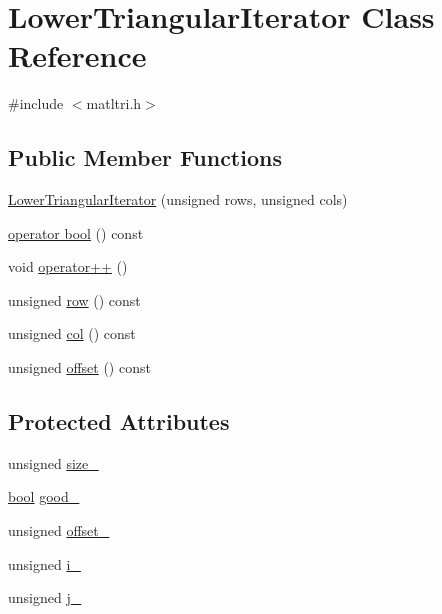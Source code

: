 \hypertarget{classLowerTriangularIterator}{}\section{Lower\+Triangular\+Iterator Class Reference}
\label{classLowerTriangularIterator}


{\ttfamily \#include $<$matltri.\+h$>$}

\subsection*{Public Member Functions}
\begin{DoxyCompactItemize}
\item 
\hyperlink{classLowerTriangularIterator_add29bef9ecb40a8b01968a773ffd753a}{Lower\+Triangular\+Iterator} (unsigned rows, unsigned cols)
\item 
\hyperlink{classLowerTriangularIterator_a1f8e805dbce1c75c1632db956964bb82}{operator bool} () const 
\item 
void \hyperlink{classLowerTriangularIterator_a3a6ef9b64d999f93ee128f74aca38527}{operator++} ()
\item 
unsigned \hyperlink{classLowerTriangularIterator_a7ab1227d3631b54fa8232a5e6be63f90}{row} () const 
\item 
unsigned \hyperlink{classLowerTriangularIterator_ae40bea60442dec3df59a9ac33f321362}{col} () const 
\item 
unsigned \hyperlink{classLowerTriangularIterator_ac7ce365e64b671be6c612d27da6b1f35}{offset} () const 
\end{DoxyCompactItemize}
\subsection*{Protected Attributes}
\begin{DoxyCompactItemize}
\item 
unsigned \hyperlink{classLowerTriangularIterator_a4e7c1d15a20473697c3d5f50bbe30048}{size\+\_\+}
\item 
\hyperlink{compiler_8h_abb452686968e48b67397da5f97445f5b}{bool} \hyperlink{classLowerTriangularIterator_a1fe365228ff5a0b895ec8385c7f56bef}{good\+\_\+}
\item 
unsigned \hyperlink{classLowerTriangularIterator_ab0e3b6c8a550e73abcde1300c7d42413}{offset\+\_\+}
\item 
unsigned \hyperlink{classLowerTriangularIterator_a463a9c160941415d1129a078f3b307d8}{i\+\_\+}
\item 
unsigned \hyperlink{classLowerTriangularIterator_a034c0e9424c86261f4268230569361e1}{j\+\_\+}
\end{DoxyCompactItemize}


